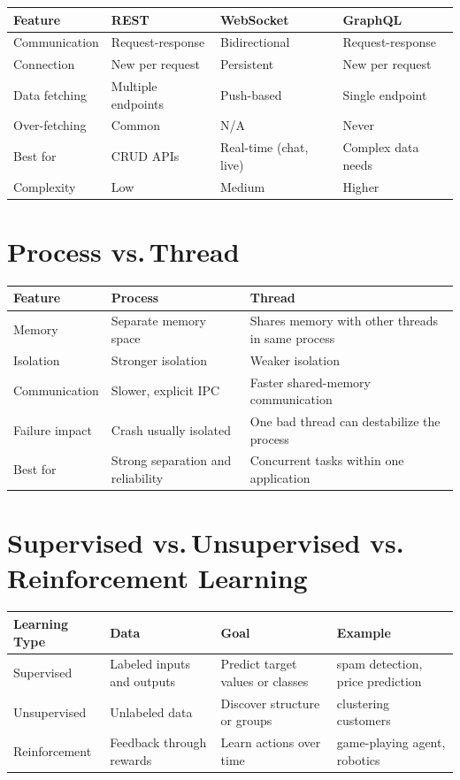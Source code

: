 \documentclass[12pt, a4paper, oneside]{book}
\begin{document}
\begin{center}
\begin{tabular}{l l l l}
\toprule
\textbf{Feature} & \textbf{REST} & \textbf{WebSocket} & \textbf{GraphQL} \\
\midrule
Communication & Request-response & Bidirectional & Request-response \\
Connection & New per request & Persistent & New per request \\
Data fetching & Multiple endpoints & Push-based & Single endpoint \\
Over-fetching & Common & N/A & Never \\
Best for & CRUD APIs & Real-time (chat, live) & Complex data needs \\
Complexity & Low & Medium & Higher \\
\bottomrule
\end{tabular}
\end{center}

\section{Process vs.\,Thread}

\begin{center}
\begin{tabular}{l l l}
\toprule
\textbf{Feature} & \textbf{Process} & \textbf{Thread} \\
\midrule
Memory & Separate memory space & Shares memory with other threads in same process \\
Isolation & Stronger isolation & Weaker isolation \\
Communication & Slower, explicit IPC & Faster shared-memory communication \\
Failure impact & Crash usually isolated & One bad thread can destabilize the process \\
Best for & Strong separation and reliability & Concurrent tasks within one application \\
\bottomrule
\end{tabular}
\end{center}

\section{Supervised vs.\,Unsupervised vs.\,Reinforcement Learning}

\begin{center}
\begin{tabular}{l l l l}
\toprule
\textbf{Learning Type} & \textbf{Data} & \textbf{Goal} & \textbf{Example} \\
\midrule
Supervised & Labeled inputs and outputs & Predict target values or classes & spam detection, price prediction \\
Unsupervised & Unlabeled data & Discover structure or groups & clustering customers \\
Reinforcement & Feedback through rewards & Learn actions over time & game-playing agent, robotics \\
\bottomrule
\end{tabular}
\end{center}
\end{document}
